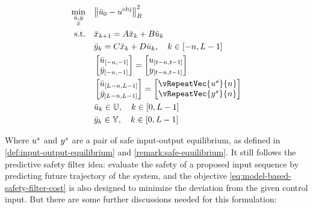 \begin{subequations}
\label{eq:model-based-safety-filter}
\begin{align}
    \min_{\substack{\bar{u}, \bar{y} \\ \bar{x}}} \quad & \norm{\baru_{0} - u^{\text{obj}}}_R^2 \label{eq:model-based-safety-filter-cost} \\
    \textrm{s.t.} \quad & 
    \bar{x}_{k+1} = A \bar{x}_k + B \bar{u}_k \nonumber \\
    &
    \bar{y}_k = C \bar{x}_k + D \bar{u}_k,  \quad k \in \left[-n, L-1\right] \label{eq:model-based-safety-filter-dynamics} \\
    & 
    \begin{bmatrix}
        \subseq{\bar{u}}{-n}{-1} \\
        \subseq{\bar{y}}{-n}{-1} \\
    \end{bmatrix} = 
    \begin{bmatrix}
        \subseq{u}{t-n}{t-1} \\
        \subseq{y}{t-n}{t-1} \\
    \end{bmatrix} \label{eq:model-based-safety-filter-initial}\\
    & 
    \begin{bmatrix}
        \subseq{\bar{u}}{L-n}{L-1} \\
        \subseq{\bar{y}}{L-n}{L-1} \\
    \end{bmatrix} = \begin{bmatrix}
        \vRepeatVec{\us}{n} \\
        \vRepeatVec{\ys}{n} \\
    \end{bmatrix} \label{eq:model-based-safety-filter-terminal}\\
    &
    \bar{u}_k \in \mathbb{U}, \quad k \in \left[0, L-1\right] \label{eq:model-based-safety-filter-input}\\
    &
    \bar{y}_k \in \mathbb{Y}, \quad k \in \left[0, L-1\right] \label{eq:model-based-safety-filter-output}
\end{align}
\end{subequations}

Where $u^s$ and $y^s$ are a pair of safe input-output equilibrium, as defined in \cref{def:input-output-equilibrium} and \cref{remark:safe-equilibrium}.
It still follows the predictive safety filter idea: evaluate the safety of a proposed input sequence by predicting future trajectory of the system, and the objective \cref{eq:model-based-safety-filter-cost} is also designed to minimize the deviation from the given control input.
But there are some further discussions needed for this formulation:

